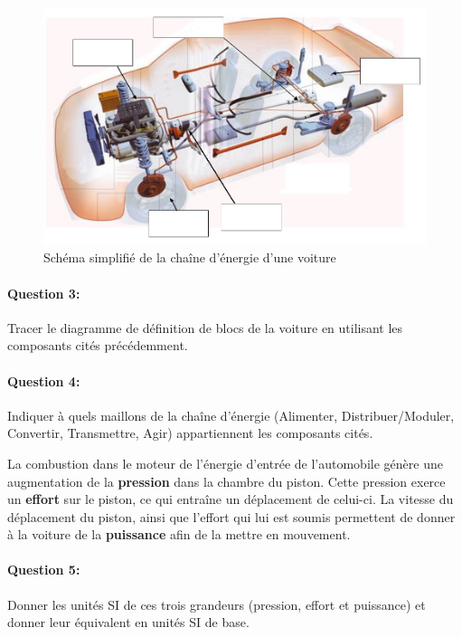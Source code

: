 \begin{figure}[htbp]
\begin{center}
\includegraphics[width=0.8\linewidth]{img/Transmission.jpg}
\caption{Schéma simplifié de la chaîne d'énergie d'une voiture}
\label{fig:image3}
\end{center}
\end{figure}

\newpage

\paragraph{Question 3:}

Tracer le diagramme de définition de blocs de la voiture en utilisant les composants cités précédemment.

\paragraph{Question 4:}

Indiquer à quels maillons de la chaîne d'énergie (Alimenter, Distribuer/Moduler, Convertir, Transmettre, Agir) appartiennent les composants cités.


La combustion dans le moteur de l'énergie d'entrée de l'automobile génère une augmentation de la \textbf{pression} dans la chambre du piston. Cette pression exerce un \textbf{effort} sur le piston, ce qui entraîne un déplacement de celui-ci. La vitesse du déplacement du piston, ainsi que l'effort qui lui est soumis permettent de donner à la voiture de la \textbf{puissance} afin de la mettre en mouvement.

\paragraph{Question 5:}

Donner les unités SI de ces trois grandeurs (pression, effort et puissance) et donner leur équivalent en unités SI de base.

